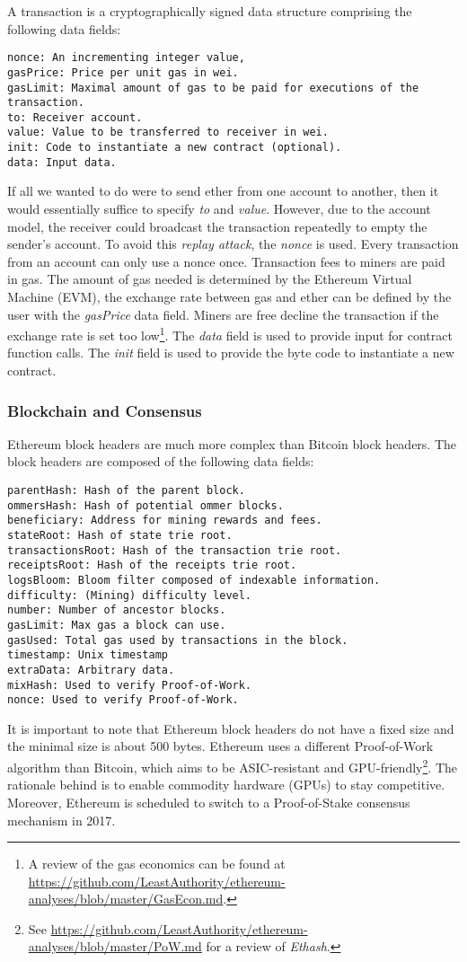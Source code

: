 A transaction is a cryptographically signed data structure comprising the following data fields:
\begin{lstlisting}[breaklines]
nonce: An incrementing integer value,
gasPrice: Price per unit gas in wei.
gasLimit: Maximal amount of gas to be paid for executions of the transaction.
to: Receiver account.
value: Value to be transferred to receiver in wei.
init: Code to instantiate a new contract (optional).
data: Input data. 
\end{lstlisting}
If all we wanted to do were to send ether from one account to another, then it would essentially suffice to specify \emph{to} and \emph{value}. However, due to the account model, the receiver could broadcast the transaction repeatedly to empty the sender's account. To avoid this \emph{replay attack}, the \emph{nonce} is used. Every transaction from an account can only use a nonce once. Transaction fees to miners are paid in gas. The amount of gas needed is determined by the Ethereum Virtual Machine (EVM), the exchange rate between gas and ether can be defined by the user with the \emph{gasPrice} data field. Miners are free decline the transaction if the exchange rate is set too low\footnote{A review of the gas economics can be found at \url{https://github.com/LeastAuthority/ethereum-analyses/blob/master/GasEcon.md}.}. The \emph{data} field is used to provide input for contract function calls. The \emph{init} field is used to provide the byte code to instantiate a new contract. 

\subsubsection{Blockchain and Consensus}
\label{sec:eth_blockchain}

Ethereum block headers are much more complex than Bitcoin block headers. The block headers are composed of the following data fields:
\begin{lstlisting}[breaklines]
parentHash: Hash of the parent block.
ommersHash: Hash of potential ommer blocks.
beneficiary: Address for mining rewards and fees.
stateRoot: Hash of state trie root.
transactionsRoot: Hash of the transaction trie root.
receiptsRoot: Hash of the receipts trie root.
logsBloom: Bloom filter composed of indexable information.
difficulty: (Mining) difficulty level.
number: Number of ancestor blocks.
gasLimit: Max gas a block can use.
gasUsed: Total gas used by transactions in the block.
timestamp: Unix timestamp
extraData: Arbitrary data.
mixHash: Used to verify Proof-of-Work.
nonce: Used to verify Proof-of-Work.
\end{lstlisting}
It is important to note that Ethereum block headers do not have a fixed size and the minimal size is about 500 bytes. Ethereum uses a different Proof-of-Work algorithm than Bitcoin, which aims to be ASIC-resistant and GPU-friendly\footnote{See \url{https://github.com/LeastAuthority/ethereum-analyses/blob/master/PoW.md} for a review of \emph{Ethash}.}. The rationale behind is to enable commodity hardware (GPUs) to stay competitive. Moreover, Ethereum is scheduled to switch to a Proof-of-Stake consensus mechanism in 2017. 

